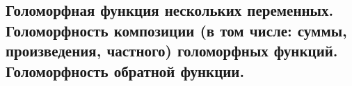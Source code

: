 \subsection{Голоморфная функция нескольких переменных. Голоморфность композиции (в том числе: суммы, произведения, частного) голоморфных функций. Голоморфность обратной функции.}
